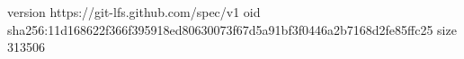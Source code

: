 version https://git-lfs.github.com/spec/v1
oid sha256:11d168622f366f395918ed80630073f67d5a91bf3f0446a2b7168d2fe85ffc25
size 313506
